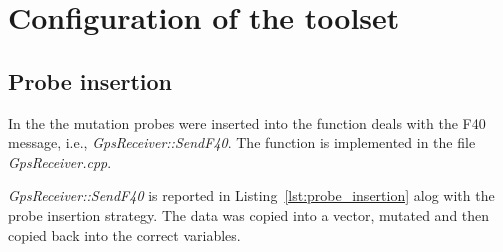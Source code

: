 
\chapter{Configuration of the toolset}

\section{Probe insertion}

In the \case the mutation probes were inserted into the function deals with the F40 message, i.e., \emph{GpsReceiver::SendF40}. The function is implemented in the file \emph{GpsReceiver.cpp}.

\emph{GpsReceiver::SendF40} is reported in Listing~\ref{lst:probe_insertion} alog with the probe insertion strategy.
The data was copied into a vector, mutated and then copied back into the correct variables.


